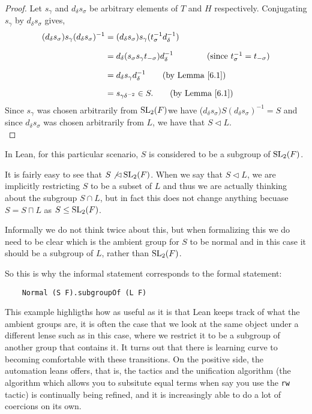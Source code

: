 \begin{proof}
    Let $s_\gamma$ and $d_\delta s_\sigma$ be arbitrary elements of $T$ and $H$ respectively. Conjugating $s_\gamma$ by $d_\delta s_\sigma$ gives,
\begin{align*} (d_\delta s_\sigma) s_\gamma (d_\delta s_\sigma)^{-1} &= (d_\delta s_\sigma) s_\gamma (t^{-1}_\sigma d^{-1}_\delta) \\[1.5ex]
&=
d_\delta (s_\sigma s_\gamma t_{-\sigma}) d^{-1}_\delta \qquad \tag{since $t^{-1}_\sigma=t_{-\sigma}$} \\[1.5ex] 
&=
d_\delta s_\gamma d^{-1}_\delta \tag{by Lemma \ref{6.1}} \\[1.5ex] 
&= s_{\gamma \delta^{-2}} \in S. \tag{by Lemma \ref{6.1}}
\end{align*}
Since $s_\gamma$ was chosen arbitrarily from $\operatorname{SL}_2(F)$we have ($d_\delta s_\sigma) S (d_\delta s_\sigma)^{-1} = S$ and since $d_\delta s_\sigma$ was chosen arbitrarily from $L$, we have that $S \vartriangleleft L$. \\
\end{proof}

\begin{remark}
    In Lean, for this particular scenario, $S$ is considered to be a subgroup of $\operatorname{SL}_2(F)$. 
    
    It is fairly easy to see that $S \not\lhd \operatorname{SL}_2(F)$. When we say that $S \lhd L$, we are implicitly restricting $S$ to be a subset of $L$ and thus we are actually thinking about the subgroup $S \cap L$,
    but in fact this does not change anything becuase $S = S \sqcap L$ as $S \le \operatorname{SL}_2(F)$.

    Informally we do not think twice about this, but when formalizing this we do need to be clear which is the ambient group for $S$ to be normal and in this case it should be a subgroup of $L$, rather than $\operatorname{SL}_2(F)$.
    
    So this is why the informal statement corresponds to the formal statement:

    \begin{verbatim}
    Normal (S F).subgroupOf (L F) 
    \end{verbatim}

    This example highligths how as useful as it is that Lean keeps track of what the ambient groups are, it is often the case that we look at the same object under a different lense such as in this case, where we restrict it to be a 
    subgroup of another group that contains it. It turns out that there is learning curve to becoming comfortable with these transitions.
    On the positive side, the automation leans offers, that is, the tactics and the unification algorithm (the algorithm which allows you to subsitute equal terms when say you use the  \texttt{rw} tactic) is continually being refined, 
    and it is increasingly able to do a lot of coercions on its own.
\end{remark}


